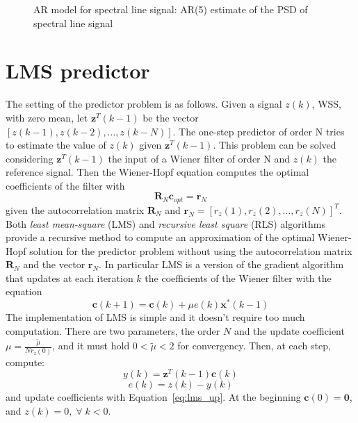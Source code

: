 \documentclass[10pt]{article}
\numberwithin{equation}{section}
\begin{document}
\begin{figure}[h!]

  \caption{AR model for spectral line signal: AR(5) estimate of the PSD of spectral line signal}
  \label{fig:psd_lines}
\end{figure}

\section{LMS predictor}
\label{sec:lms}
The setting of the predictor problem is as follows. Given a signal $z(k)$, WSS, with zero mean, let $\mathbf{z}^T(k-1)$ be the vector $[z(k-1), z(k-2), ..., z(k-N)]$. The one-step predictor of order N tries to estimate the value of $z(k)$ given $\mathbf{z}^T(k-1)$. This problem can be solved considering $\mathbf{z}^T(k-1)$ the input of a Wiener filter of order N and $z(k)$ the reference signal. Then the Wiener-Hopf equation computes the optimal coefficients of the filter with
\begin{equation}
  \mathbf{R}_N \mathbf{c}_{opt} = \mathbf{r}_N
  \label{eq:wh}
\end{equation}
given the autocorrelation matrix $\mathbf{R}_N$ and $\mathbf{r}_N = [r_z(1), r_z(2), ..., r_z(N)]^T$. \\
Both \textit{least mean-square} (LMS) and \textit{recursive least square} (RLS) algorithms provide a recursive method to compute an approximation of the optimal Wiener-Hopf solution for the predictor problem without using the autocorrelation matrix $\mathbf{R}_N$ and the vector $\mathbf{r}_N$.
In particular LMS is a version of the gradient algorithm that updates at each iteration $k$ the coefficients of the Wiener filter with the equation
\begin{equation}
  \mathbf{c}(k+1) = \mathbf{c}(k) + \mu e(k) \mathbf{x}^*(k-1)
  \label{eq:lms_up}
\end{equation}
The implementation of LMS is simple and it doesn't require too much computation. There are two parameters, the order $N$ and the update coefficient $\mu = \frac{\tilde{\mu}}{N r_z(0)}$, and it must hold $0 < \tilde{\mu} < 2$ for convergency. Then, at each step, compute:
\begin{equation}
  y(k) = \mathbf{z}^T(k-1) \mathbf{c}(k)
\end{equation}
\begin{equation}
  e(k) = z(k) - y(k)
\end{equation}
and update coefficients with Equation~\ref{eq:lms_up}. At the beginning $\mathbf{c}(0) = \mathbf{0}$, and $z(k) = 0, \; \forall \; k < 0$. \\
\end{document}
